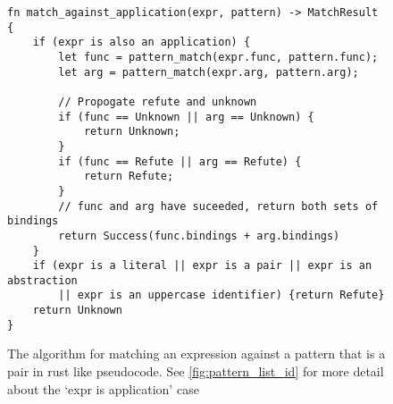 \begin{figure}[h]
    \begin{lstlisting}[language=Rust_boxed]
fn match_against_application(expr, pattern) -> MatchResult {
    if (expr is also an application) {
        let func = pattern_match(expr.func, pattern.func);
        let arg = pattern_match(expr.arg, pattern.arg);

        // Propogate refute and unknown
        if (func == Unknown || arg == Unknown) {
            return Unknown;
        }
        if (func == Refute || arg == Refute) {
            return Refute;
        }
        // func and arg have suceeded, return both sets of bindings
        return Success(func.bindings + arg.bindings)
    }
    if (expr is a literal || expr is a pair || expr is an abstraction 
        || expr is an uppercase identifier) {return Refute}
    return Unknown
}
\end{lstlisting}
    \caption{The algorithm for matching an expression against a pattern that is a pair in rust like pseudocode. See \ref{fig:pattern_list_id} for more detail about the `expr is application' case}
    \label{fig:pattern_list_app}
\end{figure}
